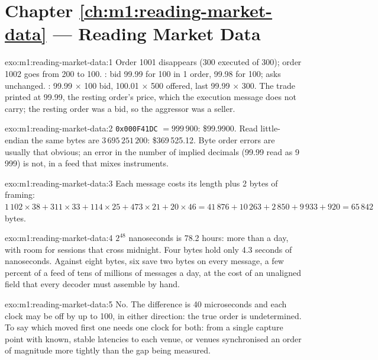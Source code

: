\section*{Chapter \ref{ch:m1:reading-market-data} --- Reading Market Data}

\begin{solution}{exo:m1:reading-market-data:1}
Order 1001 disappears (300 executed of 300); order 1002 goes from 200 to 100.
: bid 99.99 for 100 in 1 order, 99.98 for 100; asks unchanged. : 99.99 $\times$ 100 bid, 100.01 $\times$ 500 offered, last 99.99 $\times$ 300. The
trade printed at 99.99, the resting order's price, which the execution
message does not carry; the resting order was a bid, so the aggressor was a
seller.
\end{solution}

\begin{solution}{exo:m1:reading-market-data:2}
\texttt{0x000F41DC} $= 999\,900$: \$99.9900. Read little-endian the same bytes
are $3\,695\,251\,200$: \$369\,525.12. Byte order errors are usually that
obvious; an error in the number of implied decimals (99.99 read as 9\,999) is
not, in a feed that mixes instruments.
\end{solution}

\begin{solution}{exo:m1:reading-market-data:3}
Each message costs its length plus 2 bytes of framing: $1\,102 \times 38 + 311
\times 33 + 114 \times 25 + 473 \times 21 + 20 \times 46 = 41\,876 + 10\,263 + 2\,850 +
9\,933 + 920 = 65\,842$ bytes.
\end{solution}

\begin{solution}{exo:m1:reading-market-data:4}
$2^{48}$ nanoseconds is 78.2 hours: more than a day, with room for sessions
that cross midnight. Four bytes hold only 4.3 seconds of nanoseconds. Against
eight bytes, six save two bytes on every message, a few percent of a feed of
tens of millions of messages a day, at the cost of an unaligned field that
every decoder must assemble by hand.
\end{solution}

\begin{solution}{exo:m1:reading-market-data:5}
No. The difference is 40 microseconds and each clock may be off by up to 100,
in either direction: the true order is undetermined. To say which moved
first one needs one clock for both:  from a single capture
point with known, stable latencies to each venue, or venues synchronised an
order of magnitude more tightly than the gap being measured.
\end{solution}

